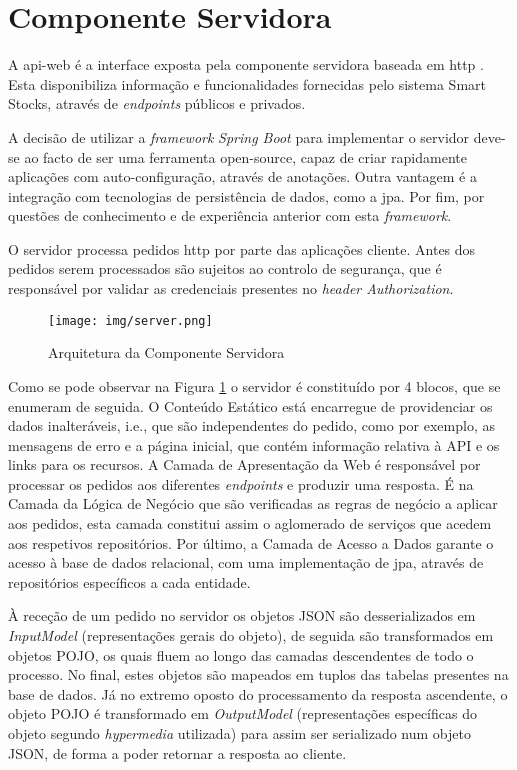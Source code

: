 \section{Componente Servidora}\label{sec33}

A \gls{api-web} é a interface exposta pela componente servidora baseada em \acrfull{http} \cite{RFC7231:http}. Esta disponibiliza informação e funcionalidades fornecidas pelo sistema Smart Stocks, através de \textit{endpoints} públicos e privados.

A decisão de utilizar a \textit{framework} \textit{Spring Boot} para implementar o servidor deve-se ao facto de ser uma ferramenta \gls{open-source}, capaz de criar rapidamente aplicações com auto-configuração, através de anotações. Outra vantagem é a integração com tecnologias de persistência de dados, como a \acrfull{jpa}. Por fim, por questões de conhecimento e de experiência anterior com esta \textit{framework}.

O servidor processa pedidos \acrshort{http} por parte das aplicações cliente. Antes dos pedidos serem processados são sujeitos ao controlo de segurança, que é responsável por validar as credenciais presentes no \textit{header Authorization}. 

\begin{figure}[H]
    \hspace*{-1,3cm}
	\centering
	\texttt{[image: img/server.png]}
	\caption{Arquitetura da Componente Servidora}
	\label{server-architecture}
\end{figure}

Como se pode observar na Figura \ref{server-architecture} o servidor é constituído por 4 blocos, que se enumeram de seguida. O Conteúdo Estático está encarregue de providenciar os dados inalteráveis, i.e., que são independentes do pedido, como por exemplo, as mensagens de erro e a página inicial, que contém informação relativa à API e os links para os recursos. A Camada de Apresentação da Web é responsável por processar os pedidos aos diferentes \textit{endpoints} e produzir uma resposta. É na Camada da Lógica de Negócio que são verificadas as regras de negócio a aplicar aos pedidos, esta camada constitui assim o aglomerado de serviços que acedem aos respetivos repositórios. Por último, a Camada de Acesso a Dados garante o acesso à base de dados relacional, com uma implementação de \acrshort{jpa}, através de repositórios específicos a cada entidade.

À receção de um pedido no servidor os objetos JSON são desserializados em \textit{InputModel} (representações gerais do objeto), de seguida são transformados em objetos POJO, os quais fluem ao longo das camadas descendentes de todo o processo. No final, estes objetos são mapeados em tuplos das tabelas presentes na base de dados. Já no extremo oposto do processamento da resposta ascendente, o objeto POJO é transformado em \textit{OutputModel} (representações específicas do objeto segundo \textit{hypermedia} utilizada) para assim ser serializado num objeto JSON, de forma a poder retornar a resposta ao cliente.


